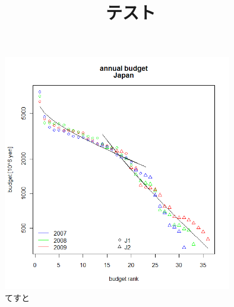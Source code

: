 \documentclass[6pt]{jreport}
\title{テスト}
\author{}
\begin{document}
\begin{figure}[htbp] %
	\begin{center}
		\includegraphics[width=100mm]{fig/japan-budget.png}
	\end{center}
	\caption{てすと}\label{fig:てすと}
\end{figure} %
\end{document}

